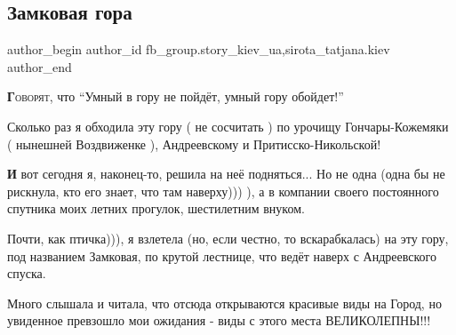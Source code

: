  
 
 
 
 
 
\subsection{Замковая гора}
\label{sec:21_08_2021.fb.fb_group.story_kiev_ua.1.zamkovaja_gora}
 
\ifcmt
 author_begin
   author_id fb_group.story_kiev_ua,sirota_tatjana.kiev
 author_end
\fi


\lettrine[lraise=0.1, nindent=0em, slope=-.5em, lines=2]{\textbf{Г}}{оворят},
что \enquote{Умный в гору не пойдёт, умный гору обойдет!}

Сколько раз я обходила эту гору ( не сосчитать ) по урочищу
Гончары-Кожемяки ( нынешней Воздвиженке ), Андреевскому и Притисско-Никольской!

\begin{multicols}{2} %
\setlength{\parindent}{0pt}

\end{multicols} %

\lettrine[lraise=0.1, nindent=0em, slope=-.5em, lines=2]{\textbf{И}}{}
вот сегодня я, наконец-то, решила на неё подняться... Но не одна (одна бы не
рискнула, кто его знает, что там наверху))) ), а в компании своего постоянного
спутника моих летних прогулок, шестилетним внуком.

Почти, как птичка))), я взлетела (но, если честно, то вскарабкалась) на эту гору, под
названием Замковая, по крутой лестнице, что ведёт наверх с Андреевского спуска.

Много слышала и читала, что отсюда открываются красивые виды на Город, но 
увиденное превзошло мои ожидания - виды с этого места ВЕЛИКОЛЕПНЫ!!!

